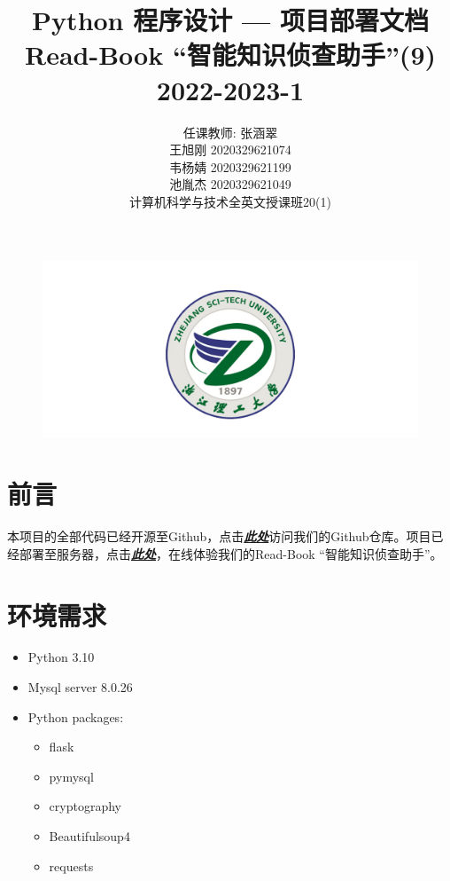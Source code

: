 \documentclass[twoside,11pt]{article}
\newcommand\studentName{\Large \centering 任课教师: 张涵翠\\王旭刚 2020329621074\\韦杨婧 2020329621199\\池胤杰 2020329621049\\计算机科学与技术全英文授课班20(1)\\}
\begin{document}
\begin{figure}[H]
    \centering
    \includegraphics[width=1\columnwidth]{figures/zstu-logo.png}
\end{figure}

\title{\Huge Python 程序设计  --- 项目部署文档\\ \vspace{1.5cm} Read-Book ``智能知识侦查助手''(9) \\ \vspace{1.5cm} \huge 2022-2023-1 \\ \vspace{0.8cm}}

\author{\name \studentName{}
    \addr
}

\maketitle
\thispagestyle{empty}
\newpage

\section{前言}
本项目的全部代码已经开源至Github，点击\href{https://github.com/Casta-mere/Read-Book}{\textbf{\emph{此处}}}访问我们的Github仓库。项目已经部署至服务器，点击\href{http://47.116.46.195/}{\textbf{\emph{此处}}}，在线体验我们的Read-Book ``智能知识侦查助手''。

\section{环境需求}
\begin{itemize}
    \item Python 3.10
    \item Mysql server 8.0.26
    \item Python packages:
          \begin{itemize}
              \item flask
              \item pymysql
              \item cryptography
              \item Beautifulsoup4
              \item requests
          \end{itemize}
\end{itemize}
\end{document}
